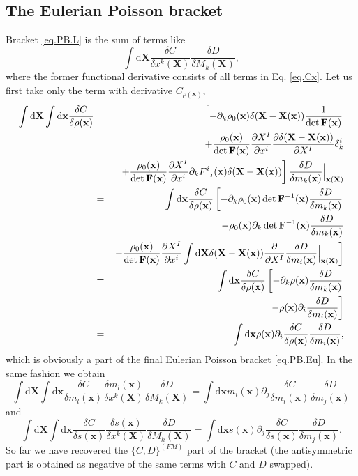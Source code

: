 \documentclass[
10pt, %
a4paper, %
oneside, %
headinclude,footinclude, %
BCOR5mm, %
]{scrartcl}
\newcommand{\xx}{\mathbf{x}}
\newcommand{\XX}{\mathbf{X}}
\newcommand{\dX}{\mathrm{d}\XX}
\newcommand{\dx}{\mathrm{d}\xx}
\newcommand{\FF}{\mathbf{F}}
\newcommand{\F}[2]{F^{#1}_{\ \, \mathsmaller#2}}
\begin{document}
\subsection{The Eulerian Poisson bracket}
Bracket \eqref{eq.PB.L} is the sum of terms like
\begin{equation}
	\int\dX \frac{\delta C}{\delta x^k(\XX)} \frac{\delta D}{\delta M_k(\XX)},
\end{equation}
where the former functional derivative consists of all terms in Eq. \eqref{eq.Cx}. Let us first take only the term with derivative $C_{\rho(\xx)}$,
\begin{eqnarray}
	\int\dX \int\dx \frac{\delta C}{\delta \rho(\xx)}&&
	\left[
		-\partial_k \rho_0(\xx) \delta(\XX-\XX(\xx))\frac{1}{\det\FF(\xx)}\right.\nonumber\\
	&&
	+\frac{\rho_0(\xx)}{\det \FF(\xx)} \frac{\partial X^I}{\partial x^i} \frac{\partial \delta(\XX-\XX(\xx))}{\partial X^I}\delta^i_k \nonumber\\
	&&\left.+\frac{\rho_0(\xx)}{\det \FF(\xx)} \frac{\partial X^I}{\partial x^i} \partial_k 
	\F{i}{I}(\xx)\delta(\XX-\XX(\xx))\right]
\frac{\delta D}{\delta m_k(\xx)}\Big|_{\xx(\XX)}\nonumber\\
	&=& \int\dx \frac{\delta C}{\delta \rho(\xx)}\left[
		-\partial_k \rho_0(\xx)\det\FF^{-1}(\xx)\frac{\delta D}{\delta m_k(\xx)} \right.\nonumber\\
		&&-\rho_0(\xx) \partial_k \det \FF^{-1}(\xx)\frac{\delta D}{\delta m_k(\xx)} \nonumber\\
		&&\left.-\frac{\rho_0(\xx)}{\det \FF(\xx)} \frac{\partial X^I}{\partial x^i} \int\dX \delta(\XX-\XX(\xx))\frac{\partial}{\partial X^I}\frac{\delta D}{\delta m_i(\xx)}\Big|_{\xx(\XX)}\right]\nonumber\\
	&=&\int\dx \frac{\delta C}{\delta \rho(\xx)}\left[-\partial_k \rho(\xx)\frac{\delta D}{\delta m_k(\xx)}\right.\nonumber\\
	&&\left.\qquad -\rho(\xx) \partial_i \frac{\delta D}{\delta m_i(\xx)}\right]\nonumber\\
	&=& \int\dx \rho(\xx)\partial_i \frac{\delta C}{\delta \rho(\xx)} \frac{\delta D}{\delta m_i(\xx)},
\end{eqnarray}
which is obviously a part of the final Eulerian Poisson bracket \eqref{eq.PB.Eu}. In the same fashion we obtain
\begin{equation}
	\int\dX \int\dx \frac{\delta C}{\delta m_l(\xx)} \frac{\delta m_l(\xx)}{\delta x^k(\XX)} \frac{\delta D}{\delta M_k(\XX)}
	= \int\dx m_i(\xx)\partial_j \frac{\delta C}{\delta m_i(\xx)} \frac{\delta D}{\delta m_j(\xx)}
\end{equation}
and
\begin{equation}
	\int\dX \int\dx \frac{\delta C}{\delta s(\xx)} \frac{\delta s(\xx)}{\delta x^k(\XX)} \frac{\delta D}{\delta M_k(\XX)}
	= \int\dx s(\xx)\partial_j \frac{\delta C}{\delta s(\xx)} \frac{\delta D}{\delta m_j(\xx)}.
\end{equation}
So far we have recovered the $\{C,D\}^{(FM)}$ part of the bracket (the antisymmetric part is obtained as negative of the same terms with $C$ and $D$ swapped).
\end{document}

